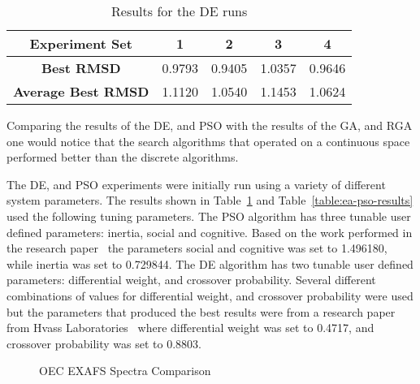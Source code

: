 \begin{table}
	\centering
	\begin{tabular}{ | >{\bfseries}c | c | c | c | c | }
		\hline
		Experiment Set & 1 & 2 & 3 & 4 \\ \hline
		Best RMSD & 0.9793 & 0.9405 & 1.0357 & 0.9646 \\ \hline
		Average Best RMSD & 1.1120 & 1.0540 & 1.1453 & 1.0624 \\ \hline
	\end{tabular}
	\caption{Results for the DE runs}
	\label{table:ea-de-results}
\end{table}

Comparing the results of the DE, and PSO with the results of the GA, and RGA one would notice that the search algorithms that operated on a continuous space performed better than the discrete algorithms.

The DE, and PSO experiments were initially run using a variety of different system parameters. The results shown in Table~\ref{table:ea-de-results} and Table~\ref{table:ea-pso-results} used the following tuning parameters. The PSO algorithm has three tunable user defined parameters: inertia, social and cognitive. Based on the work performed in the research paper~\cite{eberhart2000comparing} the parameters social and cognitive was set to 1.496180, while inertia was set to 0.729844. The DE algorithm has two tunable user defined parameters: differential weight, and crossover probability. Several different combinations of values for differential weight, and crossover probability were used but the parameters that produced the best results were from a research paper from Hvass Laboratories~\cite{pedersen2010good} where differential weight was set to 0.4717, and crossover probability was set to 0.8803.

\begin{figure*}
	\centering
	\caption{OEC EXAFS Spectra Comparison}
	\label{fig:bestRunEXAFS}
\end{figure*}